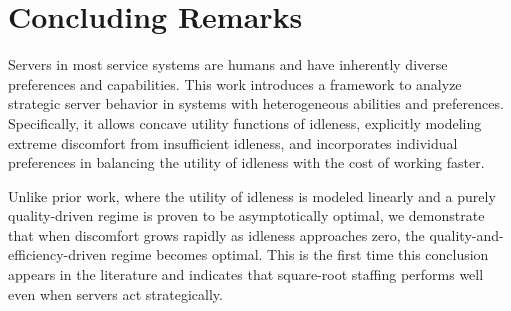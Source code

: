 \documentclass[a4paper,11pt,twoside]{article}
\numberwithin{equation}{section}
\numberwithin{figure}{section}
\theoremstyle{plain}
\newcommand{\1}{\mathbbm{1}}
\begin{document}
 
\section{Concluding Remarks}\label{sec:conclusion}

Servers in most service systems are humans and have inherently diverse preferences and capabilities. This work introduces a framework to analyze strategic server behavior in systems with heterogeneous abilities and preferences. Specifically, it allows concave utility functions of idleness, explicitly modeling extreme discomfort from insufficient idleness, and incorporates individual preferences in balancing the utility of idleness with the cost of working faster.

Unlike prior work, where the utility of idleness is modeled linearly and a purely quality-driven regime is proven to be asymptotically optimal, we demonstrate that when discomfort grows rapidly as idleness approaches zero, the quality-and-efficiency-driven regime becomes optimal. This is the first time this conclusion appears in the literature and indicates that square-root staffing performs well even when servers act strategically. 
\end{document}
